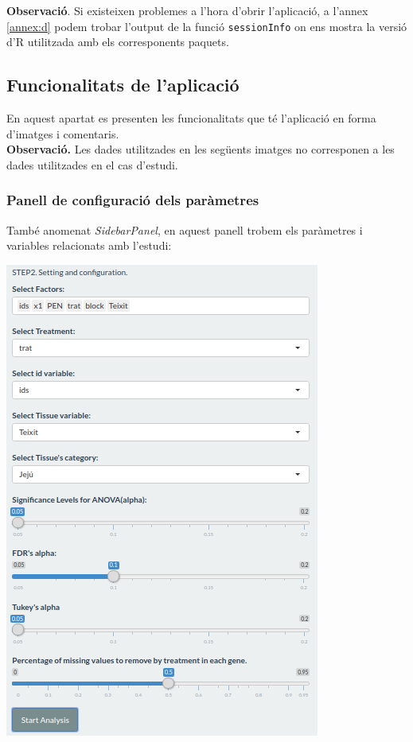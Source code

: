 \documentclass[english]{article}
\begin{document}
\textbf{Observació}. Si existeixen problemes a l'hora d'obrir l'aplicació, a l'annex \ref{annex:d} podem trobar l'output de la funció \texttt{sessionInfo} on ens mostra la versió d'R utilitzada amb els corresponents paquets.
\clearpage
\subsection{Funcionalitats de l'aplicació}
En aquest apartat es presenten les funcionalitats que té l'aplicació en forma d'imatges i comentaris.
\\

\textbf{Observació.} Les dades utilitzades en les següents imatges no corresponen a les dades utilitzades en el cas d'estudi.
\subsubsection{Panell de configuració dels paràmetres}
També anomenat \textit{SidebarPanel}, en aquest panell trobem els paràmetres i variables relacionats amb l'estudi:
\begin{center}
\includegraphics[scale=0.6]{app2.png}
\end{center}
\end{document}
